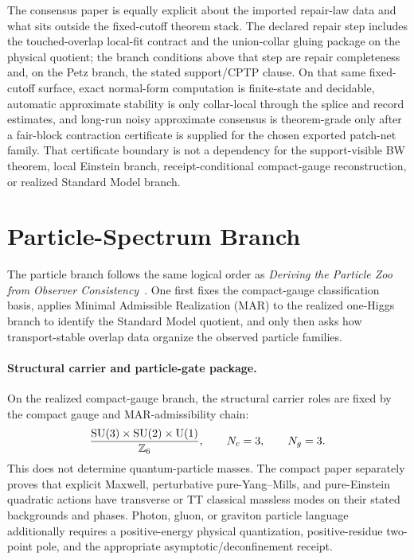 The consensus paper is equally explicit about the imported repair-law data and what sits
outside the fixed-cutoff theorem stack. The declared repair step includes the
touched-overlap local-fit contract and the union-collar gluing package on the physical quotient;
the branch conditions above that step are repair completeness and, on the Petz branch, the stated
support/CPTP clause. On that same fixed-cutoff surface, exact normal-form computation is
finite-state and decidable, automatic approximate stability is only collar-local through the
splice and record estimates, and long-run noisy approximate consensus is theorem-grade only after
a fair-block contraction certificate is supplied for the chosen exported patch-net family. That
certificate boundary is not a dependency for the support-visible BW theorem, local Einstein
branch, receipt-conditional compact-gauge reconstruction, or realized Standard Model branch.

\section{Particle-Spectrum Branch}

The particle branch follows the same logical order as
\emph{Deriving the Particle Zoo from Observer Consistency}~\cite{ophparticles}.
One first fixes the compact-gauge classification basis, applies Minimal Admissible
Realization (MAR) to the realized one-Higgs branch to identify the Standard Model quotient, and only then asks how transport-stable overlap data organize the
observed particle families.

\paragraph{Structural carrier and particle-gate package.}
On the realized compact-gauge branch, the structural carrier roles are fixed by the compact
gauge and MAR-admissibility chain:
\[
\frac{\mathrm{SU}(3)\times\mathrm{SU}(2)\times\mathrm{U}(1)}{\mathbb Z_6},
\qquad
N_c=3,
\qquad
N_g=3.
\]
This does not determine quantum-particle masses. The compact paper separately proves that explicit
Maxwell, perturbative pure-Yang--Mills, and pure-Einstein quadratic actions have transverse or TT
classical massless modes on their stated backgrounds and phases. Photon, gluon, or graviton
particle language additionally requires a positive-energy physical quantization, positive-residue
two-point pole, and the appropriate asymptotic/deconfinement receipt.

